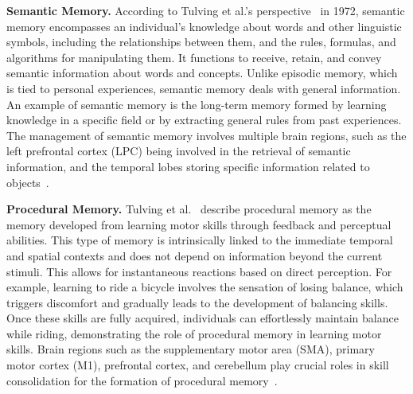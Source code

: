 \documentclass[journal,hideappendix]{vgtc}
\newenvironment{j_itemize}{
\begin{itemize}[]
  \setlength{\itemsep}{3pt}
  \setlength{\parskip}{0pt}
  \setlength{\parsep}{0pt}
}{\end{itemize}}
\begin{document}
\begin{j_itemize}
    \item[$\bullet$] \textbf{Semantic Memory.} According to Tulving et al.'s perspective~\cite{tulving1972episodic} in 1972, semantic memory encompasses an individual's knowledge about words and other linguistic symbols, including the relationships between them, and the rules, formulas, and algorithms for manipulating them. It functions to receive, retain, and convey semantic information about words and concepts. Unlike episodic memory, which is tied to personal experiences, semantic memory deals with general information. An example of semantic memory is the long-term memory formed by learning knowledge in a specific field or by extracting general rules from past experiences. 
    The management of semantic memory involves multiple brain regions, such as the left prefrontal cortex (LPC) being involved in the retrieval of semantic information, and the temporal lobes storing specific information related to objects~\cite{hodges1992semantic,baldo1998letter,martin2001semantic}.

    \item[$\bullet$] \textbf{Procedural Memory.} Tulving et al.~\cite{tulving1985memory} describe procedural memory as the memory developed from learning motor skills through feedback and perceptual abilities. This type of memory is intrinsically linked to the immediate temporal and spatial contexts and does not depend on information beyond the current stimuli. This allows for instantaneous reactions based on direct perception. For example, learning to ride a bicycle involves the sensation of losing balance, which triggers discomfort and gradually leads to the development of balancing skills. Once these skills are fully acquired, individuals can effortlessly maintain balance while riding, demonstrating the role of procedural memory in learning motor skills. Brain regions such as the supplementary motor area (SMA), primary motor cortex (M1), prefrontal cortex, and cerebellum play crucial roles in skill consolidation for the formation of procedural memory~\cite{censor2014cortico}.

\end{j_itemize}
\end{document}
